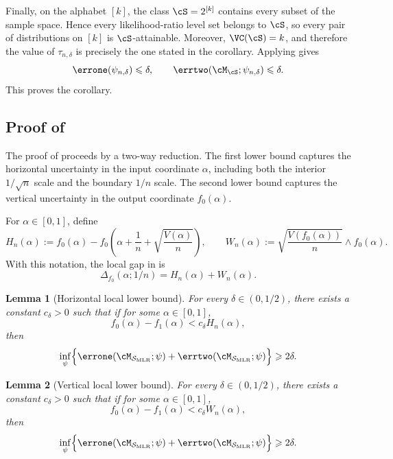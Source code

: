 \documentclass[english]{article}
\theoremstyle{plain}
\newtheorem{lemma}{Lemma}[section]
\theoremstyle{definition}
\newcommand{\errsum}[1]{\errone(\cM_{\smlr};#1)+\errtwo(\cM_{\smlr};#1)}
\newcommand{\fnull}{f_0}
\newcommand{\falt}{f_1}
\newcommand{\smlr}{\mathcal{S}_{\mathrm{MLR}}}     %
\begin{document}
Finally, on the alphabet \([k]\), the class \(\cS=2^{[k]}\) contains every
subset of the sample space. Hence every likelihood-ratio level set belongs to
\(\cS\), so every pair of distributions on \([k]\) is \(\cS\)-attainable.
Moreover, \(\VC(\cS)=k\), and therefore the value of \(\tau_{n,\delta}\) is
precisely the one stated in the corollary. Applying
 gives
\[
\errone(\psi_{n,\delta})\leqslant \delta,
\qquad
\errtwo(\cM_{\cS};\psi_{n,\delta})\leqslant \delta.
\]
This proves the corollary.

\subsection{Proof of }\label{sec:proof-minimax-lower-bound}

The proof of  proceeds by a two-way
reduction.  The first lower bound captures the horizontal uncertainty in
the input coordinate \(\alpha\), including both the interior \(1/\sqrt n\)
scale and the boundary \(1/n\) scale.  The second lower bound captures the
vertical uncertainty in the output coordinate \(\fnull(\alpha)\).

For \(\alpha\in[0,1]\), define
\[
H_n(\alpha)
:=
\fnull(\alpha)
-
\fnull\!\left(
\alpha+\frac1n+\sqrt{\frac{V(\alpha)}{n}}
\right),
\qquad
W_n(\alpha)
:=
\sqrt{\frac{V(\fnull(\alpha))}{n}}\wedge \fnull(\alpha).
\]
With this notation, the local gap in  is
\[
\Delta_{\fnull}(\alpha;1/n)=H_n(\alpha)+W_n(\alpha).
\]

\begin{lemma}[Horizontal local lower bound]\label{prop:lower-horizontal-local-full}
For every \(\delta\in(0,1/2)\), there exists a constant \(c_\delta>0\)
such that if for some \(\alpha\in[0,1]\),
\[
\fnull(\alpha)-\falt(\alpha)
<
c_\delta H_n(\alpha),
\]
then
\[
\inf_{\psi}
\Bigl\{
\errsum{\psi}
\Bigr\}
\geqslant 2\delta.
\]
\end{lemma}

\begin{lemma}[Vertical local lower bound]\label{prop:lower-vertical-local-full}
For every \(\delta\in(0,1/2)\), there exists a constant \(c_\delta>0\)
such that if for some \(\alpha\in[0,1]\),
\[
\fnull(\alpha)-\falt(\alpha)
<
c_\delta W_n(\alpha),
\]
then
\[
\inf_{\psi}
\Bigl\{
\errsum{\psi}
\Bigr\}
\geqslant 2\delta.
\]
\end{lemma}
\end{document}
